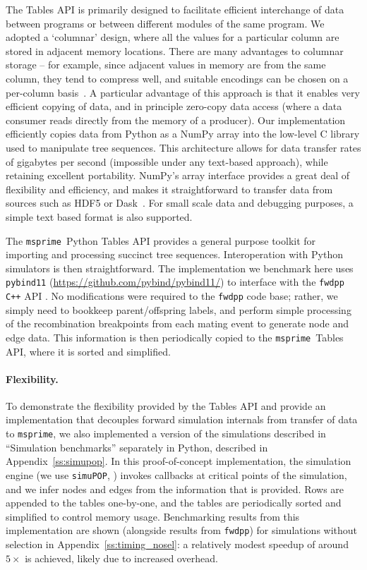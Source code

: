 \documentclass{article}
\newcommand{\simupop}{\texttt{simuPOP}}
\newcommand{\fwdpp}{\texttt{fwdpp}}
\newcommand{\cpp}{\texttt{C++}}
\newcommand{\msprime}{\texttt{msprime}}
\begin{document}
The Tables API is primarily designed to facilitate efficient interchange of
data between programs or between different modules of the same program. We
adopted a `columnar' design, where all the values for a
particular column are stored in adjacent memory locations.
There are many advantages to columnar storage -- for example, since adjacent
values in memory are from the same column, they tend to compress well,
and suitable encodings can be chosen on a per-column basis~\citep{abadi2006integrating}.
A particular advantage of this approach is that it enables very
efficient copying of data, and in principle zero-copy data access
(where a data consumer reads directly from the memory of a producer).
Our implementation
efficiently copies data from Python as a NumPy array \citep{walt2011numpy}
into the low-level C library used to manipulate tree sequences.
This architecture allows for data transfer rates of gigabytes per second
(impossible under any text-based approach), while retaining excellent portability.
NumPy's array interface provides a great deal of flexibility and efficiency,
and makes it straightforward to transfer data from sources
such as HDF5 \citep{hdf5} or Dask~\citep{dask}.
For small scale data and debugging purposes, a simple text based format is also supported.

The \msprime\ Python Tables API provides a general purpose toolkit for importing
and processing succinct tree sequences. Interoperation with Python simulators
is then straightforward.  The implementation we benchmark here uses
\texttt{pybind11} (\url{https://github.com/pybind/pybind11/}) to interface
with the \fwdpp{} \cpp{} API \citep{fwdpp}. No modifications were
required to the \fwdpp{} code base; rather, we simply need to bookkeep parent/offspring labels,
and perform simple processing of the recombination breakpoints from each mating
event to generate node and edge data. This information is then periodically copied
to the \msprime\ Tables API, where it is sorted and simplified.

\paragraph{Flexibility.}
To demonstrate the flexibility provided by the Tables API and provide an
implementation that decouples forward simulation internals from transfer of data
to \msprime, we also implemented a version of the simulations described in
``Simulation benchmarks'' separately in Python, described in Appendix~\ref{ss:simupop}.
In this proof-of-concept implementation, the simulation engine (we use \simupop{}, \citet{simupop})
invokes callbacks at critical points of the simulation, and we infer nodes and edges
from the information that is provided. Rows are appended to the tables
one-by-one, and the tables are periodically sorted and simplified to control
memory usage.
Benchmarking results from this implementation are shown (alongside results from \fwdpp{})
for simulations without selection in Appendix~\ref{ss:timing_nosel}:
a relatively modest speedup of around $5 \times$ is achieved, likely due to increased overhead.
\end{document}
